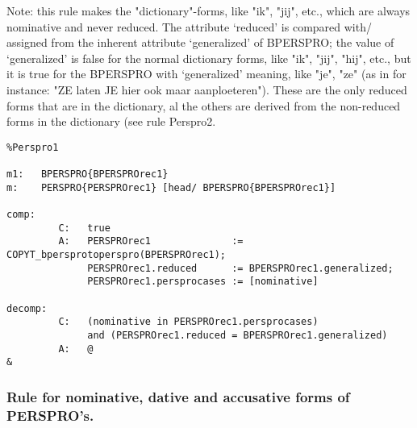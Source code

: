 Note: this rule makes the "dictionary"-forms, like "ik", "jij", etc., which are
      always nominative and never reduced.
      The attribute `reduced' is compared with/ assigned from the inherent
      attribute `generalized' of BPERSPRO; the value of `generalized' is false
      for the normal dictionary forms, like "ik", "jij", "hij", etc., but it is
      true for the BPERSPRO with `generalized' meaning, like "je", "ze" (as in
      for instance: "ZE laten JE hier ook maar aanploeteren"). These are the
      only reduced forms that are in the dictionary, al the others are derived
      from the non-reduced forms in the dictionary (see rule Perspro2.
\begin{verbatim} 
%Perspro1

m1:   BPERSPRO{BPERSPROrec1}
m:    PERSPRO{PERSPROrec1} [head/ BPERSPRO{BPERSPROrec1}]

comp:    
         C:   true
         A:   PERSPROrec1              := COPYT_bpersprotoperspro(BPERSPROrec1);
              PERSPROrec1.reduced      := BPERSPROrec1.generalized;
              PERSPROrec1.persprocases := [nominative]

decomp:  
         C:   (nominative in PERSPROrec1.persprocases) 
              and (PERSPROrec1.reduced = BPERSPROrec1.generalized)
         A:   @
&
\end{verbatim}
\newpage
\subsubsection{Rule for nominative, dative and accusative forms of PERSPRO's.}

